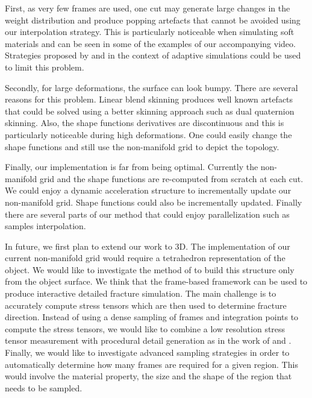 First, as very few frames are used, one cut may generate large changes in the weight distribution and produce popping artefacts that cannot be avoided using our interpolation strategy. This is particularly noticeable when simulating soft materials and can be seen in some of the examples of our accompanying video. Strategies proposed by \cite{Narain2013} and \cite{Tournier2014} in the context of adaptive simulations could be used to limit this problem. 

Secondly, for large deformations, the surface can look bumpy. There are several reasons for this problem. Linear blend skinning produces well known artefacts that could be solved using a better skinning approach such as dual quaternion skinning. Also, the shape functions derivatives are discontinuous and this is particularly noticeable during high deformations. One could easily change the shape functions and still use the non-manifold grid to depict the topology.

Finally, our implementation is far from being optimal. Currently the non-manifold grid and the shape functions are re-computed from scratch at each cut. We could enjoy a dynamic acceleration structure to incrementally update our non-manifold grid. Shape functions could also be incrementally updated. Finally there are several parts of our method that could enjoy parallelization such as samples interpolation.

In future, we first plan to extend our work to 3D. The implementation of our current non-manifold grid would require a tetrahedron representation of the object. We would like to investigate the method of \cite{Remillard2013} to build this structure only from the object surface. We think that the frame-based framework can be used to produce interactive detailed fracture simulation. The main challenge is to accurately compute stress tensors which are then used to determine fracture direction. Instead of using a dense sampling of frames and integration points to compute the stress tensors, we would like to combine a low resolution stress tensor measurement with procedural detail generation as in the work of \cite{Chen2014} and \cite{Lejemble2015}. Finally, we would like to investigate advanced sampling strategies in order to automatically determine how many frames are required for a given region. This would involve the material property, the size and the shape of the region that needs to be sampled.

